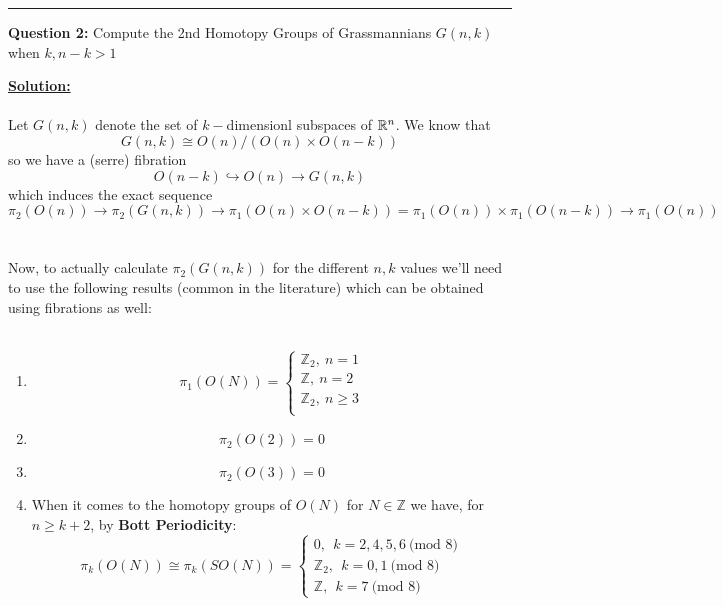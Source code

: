 \documentclass[11pt]{article}
\begin{document}
\vskip 0.5cm
\hrule
\pagebreak



\begin{bluebox}
  \textbf{Question 2:} Compute the 2nd Homotopy Groups of Grassmannians $G(n, k)$ when $k, n-k > 1$
\end{bluebox}

\vskip 0.5cm
\textbf{\underline{Solution:}}
\\
\\
Let $G(n, k)$ denote the set of $k-$dimensionl subspaces of $\mathbb{R}^n$. We know that $$ G(n,k)\cong O(n) / ( O(n) \times O(n-k) ) $$
so we have a (serre) fibration $$ O(n-k) \hookrightarrow O(n) \rightarrow G(n,k) $$ which induces the exact sequence $$
\pi_2\left( O(n) \right) \rightarrow \pi_2(G(n,k)) \rightarrow \pi_1 \left(O(n) \times O(n-k)\right) = \pi_1(O(n)) \times \pi_1(O(n-k)) \rightarrow \pi_1(O(n))
$$ 
\\
\\
Now, to actually calculate $\pi_2(G(n,k))$ for the different $n, k$ values we'll need to use the following results (common in the literature) which can be obtained using fibrations as well:
\\
\\
\begin{enumerate}[label=(\alph*)]
  \item $$\pi_1(O(N)) = \begin{cases}
    \mathbb{Z}_2,~n = 1 \\
    \mathbb{Z},~n = 2 \\
    \mathbb{Z}_2,~n \geq 3 \\
  \end{cases}$$

  \item $$
  \pi_2(O(2)) = 0
  $$

  \item $$
  \pi_2(O(3)) = 0
  $$

  \item When it comes to the homotopy groups of $O(N)$ for $N \in \mathbb{Z}$ we have, for $n \geq k + 2$, by \textbf{Bott Periodicity}:
  $$ 
  \pi_k(O(N)) \cong \pi_k(SO(N)) = \begin{cases}
    0,~~k = 2,4,5,6~\text{(mod 8)} \\
    \mathbb{Z}_2,~~k = 0,1~\text{(mod 8)} \\
    \mathbb{Z},~~k = 7~\text{(mod 8)}
  \end{cases}
  $$ 
\end{enumerate}
\end{document}
